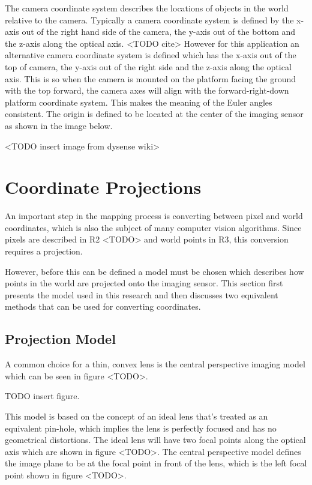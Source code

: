 The camera coordinate system describes the locations of objects in the world relative to the camera.  Typically a camera coordinate system is defined by the x-axis out of the right hand side of the camera, the y-axis out of the bottom and the z-axis along the optical axis.  <TODO cite>   However for this application an alternative camera coordinate system is defined which has the x-axis out of the top of camera, the y-axis out of the right side and the z-axis along the optical axis.  This is so when the camera is mounted on the platform facing the ground with the top forward, the camera axes will align with the forward-right-down platform coordinate system.  This makes the meaning of the Euler angles consistent.  The origin is defined to be located at the center of the imaging sensor as shown in the image below.

<TODO insert image from dysense wiki>

\section{Coordinate Projections}
 
 An important step in the mapping process is converting between pixel and world coordinates, which is also the subject of many computer vision algorithms.  Since pixels are described in R2 <TODO> and world points in R3, this conversion requires a projection.  
 
 However, before this can be defined a model must be chosen which describes how points in the world are projected onto the imaging sensor.  This section first presents the model used in this research and then discusses two equivalent methods that can be used for converting coordinates.  
 
 \subsection{Projection Model}
 
 A common choice for a thin, convex lens is the central perspective imaging model which can be seen in figure <TODO>. \
 
  TODO insert figure.
 
 This model is based on the concept of an ideal lens that's treated as an equivalent pin-hole, which implies the lens is perfectly focused and has no geometrical distortions.  The ideal lens will have two focal points along the optical axis which are shown in figure <TODO>.  The central perspective model defines the image plane to be at the focal point in front of the lens, which is the left focal point shown in figure <TODO>.  


